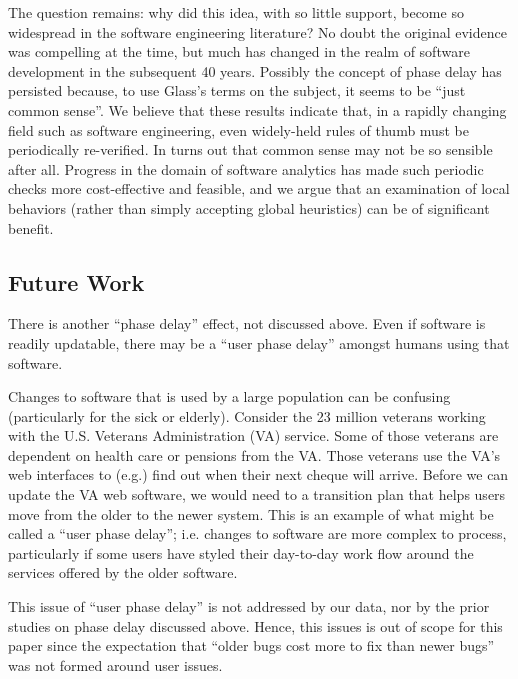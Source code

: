 \documentclass{sig-alternate}
\begin{document}


The question remains: why did this idea, with so little support, become so widespread in the software engineering literature? No doubt the original evidence was compelling at the time, but much has changed in the realm of software development in the subsequent 40 years. Possibly the concept of phase delay has persisted because, to use Glass's terms on the subject, it seems to be ``just common sense''\cite{glass02}. 
We believe that these results indicate that, in a rapidly changing field such as software engineering, even widely-held rules of thumb must be periodically re-verified. In turns out that common sense may not be so sensible after all.
Progress in the domain of software analytics has made such periodic checks more cost-effective and feasible, and we argue that an examination of local behaviors (rather than simply accepting global heuristics) can be of significant benefit.

\subsection{Future Work}
There is another ``phase delay'' effect, not discussed above. Even if software is readily updatable, there   may be a ``user phase delay''   amongst   humans using that software. 

Changes to  software that is used by a large population can be confusing (particularly for the sick or elderly). 
Consider the 23 million veterans working with  the U.S.  Veterans 
Administration (VA) service. Some of those veterans are dependent on health care or pensions from the VA. Those veterans use the VA's web interfaces
to  (e.g.) find out
when their next cheque will arrive. Before we can update the VA web software, we would
need to  a transition plan that helps users   move from the older to the newer system. This is an example of what might be called a ``user phase delay''; i.e. changes to software are more complex to process, particularly if some users have styled
their day-to-day work flow around the services offered by the older software.  

This issue of ``user phase delay'' is not addressed by our data, nor by the prior studies on phase delay discussed above.  Hence, this issues   is out of scope for this paper since the expectation that ``older bugs cost more to fix than newer bugs'' was not formed around 
user issues. 
\end{document}
